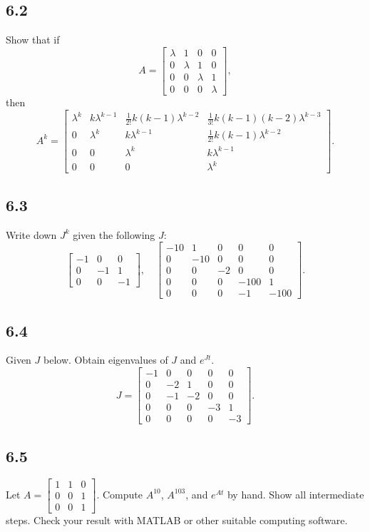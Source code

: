 \documentclass{article}
\newcommand{\problem}[2]{\subsection*{#1}}
\begin{document}
\problem{6.2}{}
Show that if
\[
A = \begin{bmatrix} \lambda & 1 & 0 & 0 \\ 0 & \lambda & 1 & 0 \\ 0 & 0 & \lambda & 1 \\ 0 & 0 & 0 & \lambda \end{bmatrix},
\]
then
\[
A^k = \begin{bmatrix}
\lambda^k & k\lambda^{k-1} & \frac{1}{2!}k(k-1)\lambda^{k-2} & \frac{1}{3!}k(k-1)(k-2)\lambda^{k-3} \\
0 & \lambda^k & k\lambda^{k-1} & \frac{1}{2!}k(k-1)\lambda^{k-2} \\
0 & 0 & \lambda^k & k\lambda^{k-1} \\
0 & 0 & 0 & \lambda^k
\end{bmatrix}.
\]

\problem{6.3}{matrix-function-drills}
Write down $J^k$ given the following $J$:
\[
\begin{bmatrix} -1 & 0 & 0 \\ 0 & -1 & 1 \\ 0 & 0 & -1 \end{bmatrix}, \quad
\begin{bmatrix}
-10 & 1 & 0 & 0 & 0 \\
0 & -10 & 0 & 0 & 0 \\
0 & 0 & -2 & 0 & 0 \\
0 & 0 & 0 & -100 & 1 \\
0 & 0 & 0 & -1 & -100
\end{bmatrix}.
\]

\problem{6.4}{matrix-function-drills}
Given $J$ below. Obtain eigenvalues of $J$ and $e^{Jt}$.
\[
J = \begin{bmatrix}
-1 & 0 & 0 & 0 & 0 \\
0 & -2 & 1 & 0 & 0 \\
0 & -1 & -2 & 0 & 0 \\
0 & 0 & 0 & -3 & 1 \\
0 & 0 & 0 & 0 & -3
\end{bmatrix}.
\]

\problem{6.5}{matrix-function-drills}
Let $A = \begin{bmatrix} 1 & 1 & 0 \\ 0 & 0 & 1 \\ 0 & 0 & 1 \end{bmatrix}$. Compute $A^{10}$, $A^{103}$, and $e^{At}$ by hand. Show all intermediate steps. Check your result with MATLAB or other suitable computing software.
\end{document}
